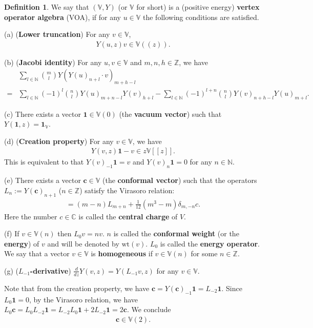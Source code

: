 \documentclass[12pt,a4paper,notitlepage]{report}
\theoremstyle{definition}
\newtheorem{df}{Definition}[section]
\theoremstyle{plain}
\newcommand{\wtd}{\widetilde}
\newcommand{\id}{\mathbf{1}}
\newcommand{\mbb}{\mathbb}
\newcommand{\mbf}{\mathbf}
\newcommand{\Vbb}{\mathbb V}
\newcommand{\cbf}{\mathbf c}
\newcommand{\wt}{\mathrm{wt}}
\numberwithin{equation}{section}
\begin{document}
\begin{df}
We say that $(\mbb V,Y)$ (or $\mbb V$ for short) is a (positive energy) \textbf{vertex operator algebra} (VOA), if for any $u\in\Vbb$  the following conditions are satisfied.

(a) (\textbf{Lower truncation}) For any $v\in \Vbb$, 
\begin{gather*}
Y(u,z)v\in\Vbb((z)).
\end{gather*}

(b) (\textbf{Jacobi identity}) For any $u,v\in \Vbb$ and $m,n,h\in\mathbb Z$, we have
\begin{align}
&\sum_{l\in\mathbb N}{m\choose l}Y(Y(u)_{n+l}\cdot v)_{m+h-l}\nonumber\\
=&\sum_{l\in\mathbb N}(-1)^l{n\choose l}Y(u)_{m+n-l}Y(v)_{h+l}-\sum_{l\in\mathbb N}(-1)^{l+n}{n\choose l}Y(v)_{n+h-l}Y(u)_{m+l}.\label{eq39}
\end{align}

(c) There exists a vector $\mbf 1\in \Vbb(0)$ (the \textbf{vacuum vector}) \index{1@$\id$} such that $Y(\mbf 1,z)=\id_\Vbb$.

(d) (\textbf{Creation property}) For any $v\in\Vbb$, we have
\begin{align*}
Y(v,z)\id-v\in z\Vbb[[z]].
\end{align*}
This is equivalent to that $Y(v)_{-1}\id=v$ and $Y(v)_n\id=0$ for any $n\in\mathbb N$.

(e) There exists a vector $\cbf\in \Vbb$ (the \textbf{conformal vector}) \index{c@$\cbf$} such that the operators $L_n:=Y(\cbf)_{n+1}$ ($n\in\mathbb Z$) satisfy the Virasoro relation:
\begin{gather}
[L_m,L_n]=(m-n)L_{m+n}+\frac 1 {12}(m^3-m)\delta_{m,-n}c.\label{eq40}
\end{gather}
Here the number $c\in\mathbb C$ is called the \textbf{central charge} of $V$.

(f) If $v\in \Vbb(n)$ then $L_0v=nv$. $n$ is called the \textbf{conformal weight} (or the \textbf{energy}) of $v$ and will be denoted by $\wt(v)$. \index{wt@$\wt(v),\wt(w),\wtd\wt(w)$} $L_0$ is called the \textbf{energy operator}. We say that a vector $v\in \mbb V$ is \textbf{homogeneous} if $v\in\mbb V(n)$ for some $n\in\mbb Z$.

(g)	(\textbf{$L_{-1}$-derivative}) $\frac d{dz} Y(v,z)=Y(L_{-1}v,z)$ for any $v\in\Vbb$.
\end{df}

Note that from the creation property, we have $\cbf=Y(\cbf)_{-1}\id=L_{-2}\id$. Since $L_0\id=0$, by the Virasoro relation, we have $L_0\cbf=L_0L_{-2}\id=L_{-2}L_0\id+2L_{-2}\id=2\cbf$. We conclude
\begin{align*}
\cbf\in\Vbb(2).
\end{align*}
\end{document}
